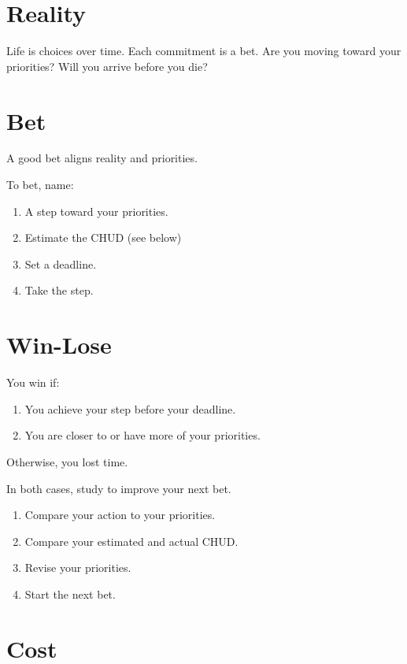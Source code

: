 \documentclass[
]{book}
\providecommand{\tightlist}{%
  \setlength{\itemsep}{0pt}\setlength{\parskip}{0pt}}
\begin{document}
\section{Reality}\label{reality}

Life is choices over time.
Each commitment is a bet.
Are you moving toward your priorities?
Will you arrive before you die?

\section{Bet}\label{bet-bet}

A good bet aligns reality and priorities.

To bet, name:

\begin{enumerate}
\def\labelenumi{\arabic{enumi}.}
\tightlist
\item
  A step toward your priorities.
\item
  Estimate the CHUD (see below)
\item
  Set a deadline.
\item
  Take the step.
\end{enumerate}

\section{Win-Lose}\label{win-lose}

You win if:

\begin{enumerate}
\def\labelenumi{\arabic{enumi}.}
\tightlist
\item
  You achieve your step before your deadline.
\item
  You are closer to or have more of your priorities.
\end{enumerate}

Otherwise, you lost time.

In both cases, study to improve your next bet.

\begin{enumerate}
\def\labelenumi{\arabic{enumi}.}
\tightlist
\item
  Compare your action to your priorities.
\item
  Compare your estimated and actual CHUD.
\item
  Revise your priorities.
\item
  Start the next bet.
\end{enumerate}

\section{Cost}\label{cost}
\end{document}
